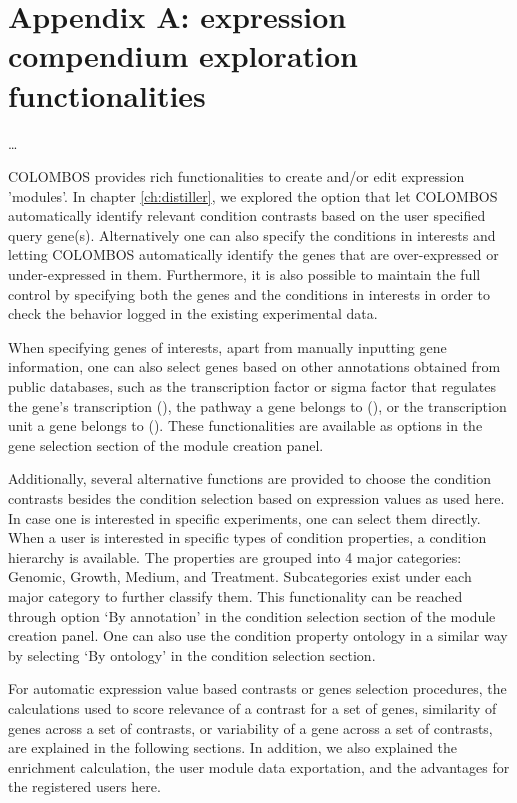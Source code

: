 \chapter{Appendix A: expression compendium exploration 
functionalities}\label{ch:apd-colombos}

\ldots

\instructionsappendices



COLOMBOS provides rich functionalities to create and/or edit expression 
'modules'. In chapter \ref{ch:distiller}, we explored the option that let 
COLOMBOS automatically identify relevant condition contrasts based on 
the user specified query gene(s).  Alternatively one can also 
specify the conditions in interests and letting COLOMBOS automatically identify 
the genes that are over-expressed or under-expressed in them. Furthermore, it 
is also possible to maintain the full control by specifying both the genes and 
the conditions in interests in order to check the behavior logged in the 
existing experimental data.

When specifying genes of interests, apart from manually inputting gene 
information, one can also select genes based on other annotations obtained from 
public databases, such as the transcription factor or sigma factor that 
regulates the gene’s transcription (\cite{Gama-Castro2008}), the pathway a gene 
belongs to (\cite{Karp2005}), or the transcription unit a gene belongs to 
(\cite{Karp2005}). 
These functionalities are available as options in the gene selection section 
of the module creation panel. 

Additionally, several alternative functions are provided to choose the 
condition contrasts besides the condition selection based on expression values 
as used here. In case one is interested in specific experiments, one can select 
them directly. When a user is interested in specific types of condition 
properties, a condition hierarchy is available. The properties are grouped into 
4 major categories: Genomic, Growth, Medium, and Treatment. Subcategories exist 
under each major category to further classify them. This functionality can be 
reached through option `By annotation' in the condition selection section 
of the module creation panel. One can also use the condition 
property ontology in a similar way by selecting `By ontology' in the condition 
selection section.

For automatic expression value based contrasts or genes selection procedures, 
the calculations used to score relevance of a contrast for 
a set of genes, similarity of genes across a set of contrasts, or variability 
of a gene across a set of contrasts, are explained in the following sections.  
In addition, we also explained the enrichment calculation, the user module data 
exportation, and the advantages for the registered users here.

